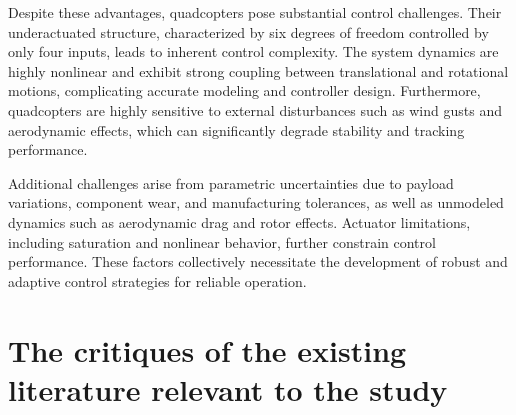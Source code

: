 Despite these advantages, quadcopters pose substantial control challenges. Their underactuated structure, characterized by six degrees of freedom controlled by only four inputs, leads to inherent control complexity. The system dynamics are highly nonlinear and exhibit strong coupling between translational and rotational motions, complicating accurate modeling and controller design. Furthermore, quadcopters are highly sensitive to external disturbances such as wind gusts and aerodynamic effects, which can significantly degrade stability and tracking performance.

Additional challenges arise from parametric uncertainties due to payload variations, component wear, and manufacturing tolerances, as well as unmodeled dynamics such as aerodynamic drag and rotor effects. Actuator limitations, including saturation and nonlinear behavior, further constrain control performance. These factors collectively necessitate the development of robust and adaptive control strategies for reliable operation.

\section{ The critiques of the existing literature relevant to the study  } 

